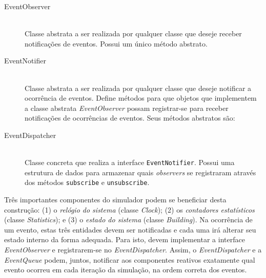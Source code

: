 \begin{description}
  \item[EventObserver] \hfill \\
    Classe abstrata a ser realizada por qualquer classe que deseje receber
    notificações de eventos. Possui um único método abstrato.


  \item[EventNotifier] \hfill \\
    Classe abstrata a ser realizada por qualquer classe que deseje notificar a
    ocorrência de eventos. Define métodos para que objetos que implementem a
    classe abstrata \textit{EventObserver} possam registrar-se para receber
    notificações de ocorrências de eventos. Seus métodos abstratos são:


  \item[EventDispatcher] \hfill \\
    Classe concreta que realiza a interface \texttt{EventNotifier}. Possui uma
    estrutura de dados para armazenar quais \textit{observers} se registraram
    através dos métodos \texttt{subscribe} e \texttt{unsubscribe}.
\end{description}

Três importantes componentes do simulador podem se beneficiar desta construção:
(1) o \textit{relógio do sistema} (classe \textit{Clock}); (2) os
\textit{contadores estatísticos} (classe \textit{Statistics}); e (3) o
\textit{estado do sistema} (classe \textit{Building}). Na ocorrência de um
evento, estas três entidades devem ser notificadas e cada uma irá alterar seu
estado interno da forma adequada. Para isto, devem implementar a interface
\textit{EventObserver} e registrarem-se no \textit{EventDispatcher}. Assim, o
\textit{EventDispatcher} e a \textit{EventQueue} podem, juntos, notificar aos
componentes reativos exatamente qual evento ocorreu em cada iteração da
simulação, na ordem correta dos eventos.

